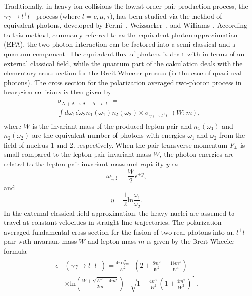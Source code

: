 \documentclass[twocolumn,epjc3]{svjour3}\sloppy
\begin{document}
\label{sec:flux}
Traditionally, in heavy-ion collisions the lowest order pair production process, the $\gamma\gamma \rightarrow l^+l^-$ process (where $l=e, \mu, \tau$), has been studied via the method of equivalent photons, developed by Fermi~\cite{fermiUberTheorieStosses1924}, Weizsacker~\cite{weizsaeckerAusstrahlungBeiStoessen1934}, and Williams~\cite{williamsNatureHighEnergy1934}. According to this method, commonly referred to as the equivalent photon approximation (EPA), the two photon interaction can be factored into a semi-classical and a quantum component. The equivalent flux of photons is dealt with in terms of an external classical field, while the quantum part of the calculation deals with the elementary cross section for the Breit-Wheeler process (in the case of quasi-real photons). 
The cross section for the polarization averaged two-photon process in heavy-ion collisions is then given by
\begin{align}
    \begin{split}
    & \sigma_{\mathrm{A + A}\rightarrow\mathrm{A + A} + l^+l^-}  = \\ & \int  d\omega_1 d\omega_2  n_1(\omega_1) n_2(\omega_2) \times \sigma_{\gamma\gamma\rightarrow l^+l^-}(W; m), 
    \end{split}
\end{align}
where $W$ is the invariant mass of the produced lepton pair and $n_1(\omega_1)$ and $n_2(\omega_2)$ are the equivalent number of photons with energies $\omega_1$ and $\omega_2$ from the field of nucleus 1 and 2, respectively. When the pair transverse momentum $P_\perp$ is small compared to the lepton pair invariant mass $W$, the photon energies are related to the lepton pair invariant mass and rapidity $y$ as
\begin{equation}
    \omega_{1,2} = \frac{W}{2}e^{\pm y},
\end{equation}
and
\begin{equation}
    y=\frac{1}{2}\text{ln}\frac{\omega_{1}}{\omega_{2}}.
\end{equation}
In the external classical field approximation, the heavy nuclei are assumed to travel at constant velocities in straight-line trajectories. 
The polarization-averaged fundamental cross section for the fusion of two real photons into an $l^+l^-$ pair with invariant mass $W$ and lepton mass $m$ is given by the Breit-Wheeler formula~\cite{breitCollisionTwoLight1934,brodskyTwoPhotonMechanismParticle1971a}
\begin{align}
    \begin{split}
    \label{eq:bw}
        \sigma & (\gamma \gamma \rightarrow l^{+}l^{-}) =  \frac{4\pi \alpha_{em}^{2}}{W^{2}} \left[ \left(2+\frac{8m^{2}}{W^{2}} - \frac{16m^{4}}{W^{4}}\right) \right. \\
        & \times\text{ln}\left(\frac{W+\sqrt{W^{2}-4m^{2}}}{2m}\right) \left. -\sqrt{1-\frac{4m^{2}}{W^{2}}}\left(1+\frac{4m^{2}}{W^{2}}\right)\right].
  \end{split}
\end{align}
\end{document}
